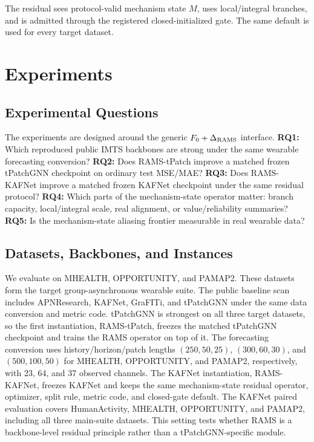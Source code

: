 ﻿\documentclass[10pt,conference]{IEEEtran}
\newcommand{\method}{\textnormal{\mbox{RAMS}}}
\newcommand{\tpatchinst}{\textnormal{\mbox{RAMS-tPatch}}}
\newcommand{\kafinst}{\textnormal{\mbox{RAMS-KAFNet}}}
\newcommand{\baseT}{\textnormal{\mbox{tPatchGNN}}}
\newcommand{\baseK}{\textnormal{\mbox{KAFNet}}}
\begin{document}
The residual sees protocol-valid mechanism state \(M\), uses local/integral
branches, and is admitted through the registered closed-initialized gate.  The
same default is used for every target dataset.

\section{Experiments}

\subsection{Experimental Questions}

The experiments are designed around the generic \(F_0+\Delta_{\rm RAMS}\)
interface.  \textbf{RQ1:} Which reproduced public IMTS backbones are strong
under the same wearable forecasting conversion?  \textbf{RQ2:} Does
\tpatchinst{} improve a matched frozen \baseT{} checkpoint on ordinary test
MSE/MAE?  \textbf{RQ3:} Does \kafinst{} improve a matched frozen \baseK{}
checkpoint under the same residual protocol?  \textbf{RQ4:} Which parts of the
mechanism-state operator matter: branch capacity, local/integral scale, real
alignment, or value/reliability summaries?  \textbf{RQ5:} Is the
mechanism-state aliasing frontier measurable in real wearable data?

\subsection{Datasets, Backbones, and Instances}

We evaluate on MHEALTH, OPPORTUNITY, and PAMAP2.  These datasets form the
target group-asynchronous wearable suite.  The public baseline scan includes
APNResearch, \baseK{}, GraFITi, and \baseT{} under the same data conversion and
metric code.  \baseT{} is strongest on all three target datasets, so the first
instantiation, \tpatchinst{}, freezes the matched \baseT{} checkpoint and
trains the \method{} operator on top of it.  The forecasting conversion uses
history/horizon/patch lengths
\((250,50,25)\), \((300,60,30)\), and \((500,100,50)\) for MHEALTH,
OPPORTUNITY, and PAMAP2, respectively, with 23, 64, and 37 observed channels.
The \baseK{} instantiation, \kafinst{}, freezes \baseK{} and keeps the same
mechanism-state residual operator, optimizer, split rule, metric code, and
closed-gate default.  The \baseK{} paired evaluation covers HumanActivity,
MHEALTH, OPPORTUNITY, and PAMAP2, including all three main-suite datasets.
This setting tests whether \method{} is a backbone-level residual principle
rather than a \baseT{}-specific module.
\end{document}
